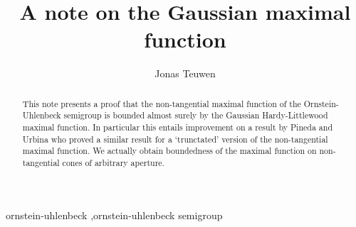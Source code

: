 \documentclass[preprint,12pt]{elsarticle}
\theoremstyle{remark}
\begin{document}
\begin{frontmatter}



\title{A note on the Gaussian maximal function}







\author{Jonas Teuwen}%
\address{Delft Institute of Applied Mathematics,
  Delft University of Technology, P.O. Box 5031, 2600 GA Delft, The
  Netherlands}%





\begin{abstract}
  This note presents a proof that the non-tangential maximal function of the
  Ornstein-Uhlenbeck semigroup is bounded almost surely by the Gaussian
  Hardy-Littlewood maximal function.  In particular this entails improvement on
  a result by Pineda and Urbina \cite{Pineda2008} who proved a similar result
  for a `trunctated' version of the non-tangential maximal function. We
  actually obtain boundedness of the maximal function on non-tangential cones
  of arbitrary aperture.
\end{abstract}

\begin{keyword}
ornstein-uhlenbeck \sep ornstein-uhlenbeck semigroup
\end{keyword}

\end{frontmatter}
\end{document}
